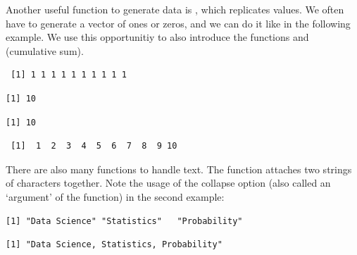 Another useful function to generate data is , which replicates values.
We often have to generate a vector of ones or zeros, and we can do it like in the following example. We use this opportunitiy to also introduce the functions  and  (cumulative sum).
\begin{knitrout}
\color{fgcolor}\begin{kframe}
\begin{alltt}
 \hlkwb{<-} \hlstd{(}\hlstd{,} \hlstd{))}
\end{alltt}
\begin{verbatim}
 [1] 1 1 1 1 1 1 1 1 1 1
\end{verbatim}
\begin{alltt}
\end{alltt}
\begin{verbatim}
[1] 10
\end{verbatim}
\begin{alltt}
\end{alltt}
\begin{verbatim}
[1] 10
\end{verbatim}
\begin{alltt}
\end{alltt}
\begin{verbatim}
 [1]  1  2  3  4  5  6  7  8  9 10
\end{verbatim}
\end{kframe}
\end{knitrout}

There are also many functions to handle text. The  function attaches two strings of characters together. Note the usage of the collapse option (also called an `argument' of the function) in the second example:
\begin{knitrout}
\color{fgcolor}\begin{kframe}
\begin{alltt}
\end{alltt}
\begin{verbatim}
[1] "Data Science" "Statistics"   "Probability" 
\end{verbatim}
\begin{alltt}
 \hlstd{=}\hlstd{)}
\end{alltt}
\begin{verbatim}
[1] "Data Science, Statistics, Probability"
\end{verbatim}
\end{kframe}
\end{knitrout}

